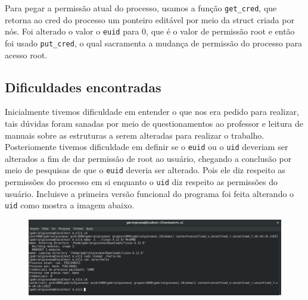\documentclass[12pt]{article}
\begin{document}
    Para pegar a permissão atual do processo, usamos a função \texttt{get\_cred},
    que retorna ao cred do processo um ponteiro editável
    por meio da struct criada por nós. Foi alterado o valor o \texttt{euid} para $0$, que é o valor de permissão root e então foi usado \texttt{put\_cred},
    o qual sacramenta a mudança de permissão do processo para acesso root.

\subsection*{Dificuldades encontradas}
    Inicialmente tivemos dificuldade em entender o que nos era pedido
    para realizar, tais dúvidas foram sanadas por meio de
    questionamentos ao professor e leitura de manuais sobre as estruturas
    a serem alteradas para realizar o trabalho. Posteriomente tivemos dificuldade
    em definir se o \texttt{euid} ou o \texttt{uid} deveriam ser alterados
    a fim de dar permissão de root ao usuário, chegando a conclusão por meio
    de pesquisas de que o \texttt{euid} deveria ser alterado. Pois ele diz respeito
    as permissões do processo em si enquanto o \texttt{uid} diz respeito as
    permissões do usuário. Incluisve a primeira versão funcional do programa foi feita alterando o
    \texttt{uid} como mostra a imagem abaixo.
    \newline

    \begin{figure}[h]
      \includegraphics[width=\textwidth]{print}
      \centering
    \end{figure}
\end{document}
